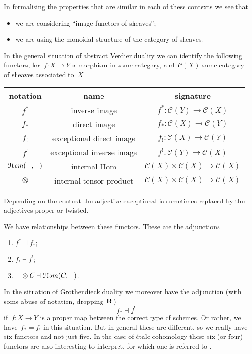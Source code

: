 In formalising the properties that are similar in each of these contexts we see that
\begin{itemize}
  \item we are considering ``image functors of sheaves'';
  \item we are using the monoidal structure of the category of sheaves.
\end{itemize}
In the general situation of abstract Verdier duality we can identify the following functors, for~$f\colon X\to Y$ a morphism in some category, and~$\mathcal{C}(X)$ some category of sheaves associated to~$X$.
\begin{center}
  \begin{tabular}{ccc}
    \toprule
    notation & name & signature \\\midrule
    $f^*$ & inverse image & $f^*\colon\mathcal{C}(Y)\to\mathcal{C}(X)$ \\
    $f_*$ & direct image & $f_*\colon\mathcal{C}(X)\to\mathcal{C}(Y)$ \\
    $f_!$ & exceptional direct image & $f_!\colon\mathcal{C}(X)\to\mathcal{C}(Y)$ \\
    $f^!$ & exceptional inverse image & $f^!\colon\mathcal{C}(Y)\to\mathcal{C}(X)$ \\
    $\operatorname{\mathcal{H}\mathit{om}}(-,-)$ & internal Hom & $\mathcal{C}(X)\times\mathcal{C}(X)\to\mathcal{C}(X)$ \\
    $-\otimes-$ & internal tensor product & $\mathcal{C}(X)\times\mathcal{C}(X)\to\mathcal{C}(X)$ \\
    \bottomrule
  \end{tabular}
\end{center}
Depending on the context the adjective exceptional is sometimes replaced by the adjectives proper or twisted.

We have relationships between these functors. These are the adjunctions
\begin{enumerate}
  \item $f^*\dashv f_*$;
  \item $f_!\dashv f^!$;
  \item $-\otimes C\dashv \operatorname{\mathcal{H}\mathit{om}}(C,-)$.
\end{enumerate}
In the situation of Grothendieck duality we moreover have the adjunction (with some abuse of notation, dropping~$\mathbf{R}$)
\begin{equation}
  f_*\dashv f^!
\end{equation}
if~$f\colon X\to Y$ is a proper map between the correct type of schemes. Or rather, we have~$f_*=f_!$ in this situation. But in general these are different, so we really have six functors and not just five. In the case of \'etale cohomology these six (or four) functors are also interesting to interpret, for which one is referred to \cite{milne-etale-cohomology}.

